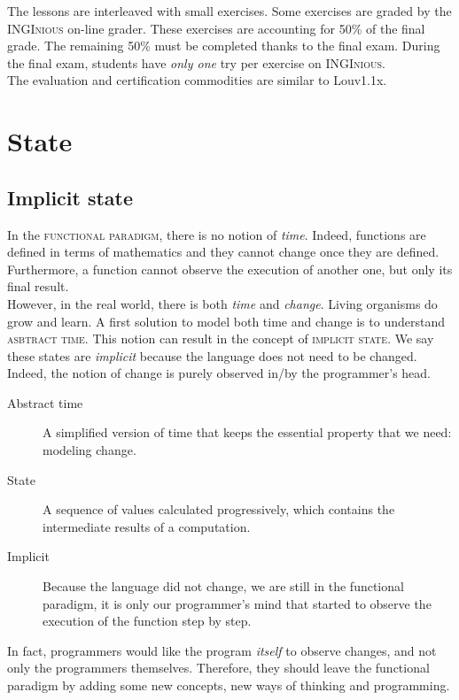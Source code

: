 \documentclass[11pt,a4paper,twoside,openright]{report}
\begin{document}
The lessons are interleaved with small exercises. Some exercises are graded by 
the \textsc{INGInious} on-line grader. These exercises are accounting for 50\% 
of 
the final grade. The remaining 50\% must be completed thanks to the final exam. 
During the final exam, students have \textit{only one} try per exercise on 
\textsc{INGInious}.\\

The evaluation and certification commodities are similar to Louv1.1x.

\section{State}

\subsection{Implicit state}

In the \textsc{functional paradigm}, there is no notion of \textit{time}. 
Indeed, functions are defined in terms of mathematics and they cannot change 
once they are defined. Furthermore, a function cannot observe the execution of 
another one, but only its final result.\\

However, in the real world, there is both \textit{time} and \textit{change}. 
Living organisms do grow and learn. A first solution to model both time and 
change is to understand \textsc{asbtract time}. This notion can result in the 
concept of \textsc{implicit state}. We say these states are \textit{implicit} 
because the language does not need to be changed. Indeed, the notion of change 
is purely observed in/by the programmer's head.

\begin{description}
 \item[Abstract time] A simplified version of time that keeps the essential 
property that we need: modeling change.
 \item[State] A sequence of values calculated progressively, which contains the 
intermediate results of a computation.
 \item[Implicit] Because the language did not change, we are still in the 
functional paradigm, it is only our programmer's mind that started to observe 
the 
execution of the function step by step.
\end{description}

In fact, programmers would like the program \textit{itself} to observe changes, 
and not only the programmers themselves. Therefore, they should leave the 
functional paradigm by adding some new concepts, new ways of thinking and 
programming.
\end{document}
